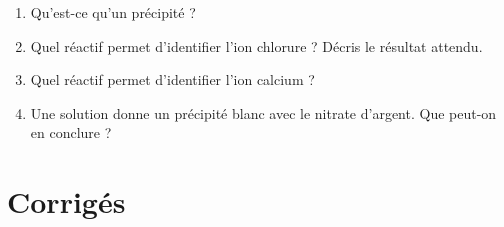 \begin{enumerate}[label=\arabic*)]
\item Qu'est-ce qu'un précipité ?
\item Quel réactif permet d'identifier l'ion chlorure ? Décris le résultat attendu.
\item Quel réactif permet d'identifier l'ion calcium ?
\item Une solution donne un précipité blanc avec le nitrate d'argent. Que peut-on en
conclure ?
\end{enumerate}

\section{Corrigés}
